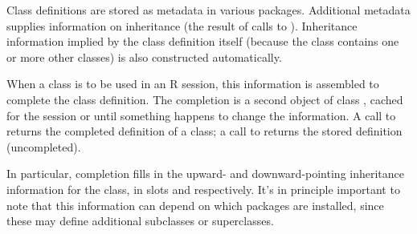 \begin{Details}\relax
Class definitions are stored as metadata in various packages.
Additional metadata supplies information on inheritance (the result of
calls to ).  Inheritance information implied by the
class definition itself (because the class contains one or more other
classes) is also constructed automatically.

When a class is to be used in an R session, this information is
assembled to complete the class definition.  The completion is a
second object of class , cached for the
session or until something happens to change the information.  A call
to  returns the completed definition of a class;
a call to  returns the stored definition
(uncompleted).

In particular, completion fills in the upward- and downward-pointing
inheritance information for the class, in slots  and
 respectively.  It's in principle important to note
that this information can depend on which packages are installed,
since these may define additional subclasses or superclasses.
\end{Details}
%
